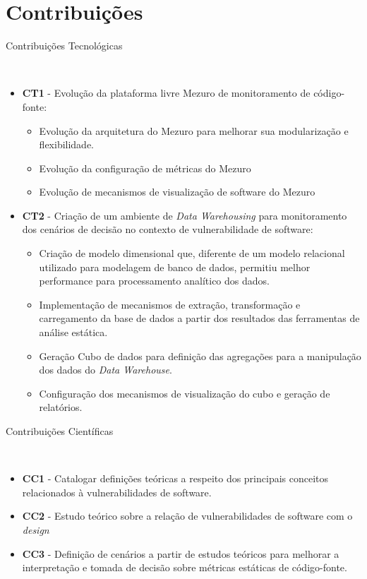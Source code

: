 \section{Contribuições}
%
\begin{description}
	\item [Contribuições Tecnológicas]\
\end{description}
		\begin{itemize}
			\item \textbf{CT1} - Evolução da plataforma livre Mezuro de monitoramento de código-fonte:
				\begin{itemize}
					\item Evolução da arquitetura do Mezuro para melhorar sua modularização e flexibilidade.
					\item Evolução da configuração de métricas do Mezuro
					\item Evolução de mecanismos de visualização de software do Mezuro
				\end{itemize}
			\item \textbf{CT2} - Criação de um ambiente de \emph{Data Warehousing} para monitoramento dos cenários de decisão no contexto de vulnerabilidade de software:
	        	\begin{itemize}
	        		\item Criação de modelo dimensional que, diferente de um modelo relacional utilizado para modelagem de banco de dados, permitiu melhor performance para processamento analítico dos dados.
	        		\item Implementação de mecanismos de extração, transformação e carregamento da base de dados a partir dos resultados das ferramentas de análise estática.
	        		\item Geração Cubo de dados para definição das agregações para a manipulação dos dados do \emph{Data Warehouse}.
					\item Configuração dos mecanismos de visualização do cubo e geração de relatórios.
	        	\end{itemize}
		\end{itemize}
\begin{description}
	\item [Contribuições Científicas]\
\end{description}	
	 	\begin{itemize}
			\item \textbf{CC1} - Catalogar definições teóricas a respeito dos principais conceitos relacionados à vulnerabilidades de software.
			\item \textbf{CC2} - Estudo teórico sobre a relação de vulnerabilidades de software com o \emph{design}
			\item \textbf{CC3} - Definição de cenários a partir de estudos teóricos para melhorar a interpretação e tomada de decisão sobre métricas estáticas de código-fonte.
	 	\end{itemize}

